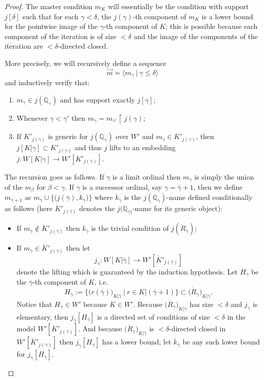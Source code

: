 \documentclass{amsart}
\begin{document}
\begin{proof}
The master condition $m_K$ will essentially be the condition with support $j[\delta]$ such that for each $\gamma < \delta$, the $j(\gamma)$-th component of $m_K$ is a lower bound for the pointwise image of the $\gamma$-th component of $K$; this is possible because each component of the iteration is of size $<\delta$ and the image of the components of the iteration are $<\delta$-directed closed.

More precisely, we will recursively define a sequence
\[
\vec{m} = \langle m_\gamma \ | \ \gamma \le \delta \rangle
\]
 and inductively verify that:
\begin{enumerate}
 \item $m_\gamma \in j(\mathbb{Q}_\gamma)$ and has support exactly $j[\gamma]$;
 \item Whenever $\gamma < \gamma'$ then $m_\gamma = m_{\gamma'} \restriction j(\gamma)$;
 \item If $K'_{j(\gamma)}$ is generic for $j(\mathbb{Q}_\gamma)$ over $W'$ and $m_\gamma \in K'_{j(\gamma)}$, then $j[K|\gamma] \subset K'_{j(\gamma)}$ and thus $j$ lifts to an embedding $j: W[K|\gamma] \to W'[K'_{j(\gamma)}]$.
\end{enumerate}

The recursion goes as follows.  If $\gamma$ is a limit ordinal then $m_\gamma$ is simply the union of the $m_\beta$ for $\beta < \gamma$.  If $\gamma$ is a successor ordinal, say $\gamma = \bar{\gamma}+1$, then we define $m_{\bar{\gamma}+1}$ as $m_{\bar{\gamma}} \cup \{ \big(j(\bar{\gamma}), \dot{k}_{\bar{\gamma}} \big) \}$ where $\dot{k}_{\bar{\gamma}}$ is the $j(\mathbb{Q}_{\bar{\gamma}})$-name defined conditionally as follows (here $\dot{K}'_{j(\bar{\gamma})}$ denotes the $j(\mathbb{Q}_{\bar{\gamma})}$-name for its generic object):
\begin{itemize}
 \item If $m_{\bar{\gamma}} \notin \dot{K}'_{j(\bar{\gamma})}$ then $\dot{k}_{\bar{\gamma}}$ is the trivial condition of $j(\dot{R}_{\bar{\gamma}})$;
 \item If $m_{\bar{\gamma}} \in \dot{K}'_{j(\bar{\gamma})}$ then let 
\[ 
 j_{\bar{\gamma}}: W[K|\bar{\gamma}] \to  W'[\dot{K}'_{j(\bar{\gamma})}]
\]
denote the lifting which is guaranteed by the induction hypothesis.  Let $H_{\bar{\gamma}}$ be the $\bar{\gamma}$-th component of $K$, i.e.\ 
 \[
 H_{\bar{\gamma}}:= \{ \big(r(\bar{\gamma})\big)_{K|\bar{\gamma}} \ | \  r \in K|(\bar{\gamma}+1)   \} \subset \big( \dot{R}_{\bar{\gamma}} \big)_{K|\bar{\gamma}}.
 \]
Notice that $H_{\bar{\gamma}} \in W'$ because $K \in W'$.  Because $\big( \dot{R}_{\bar{\gamma}} \big)_{K|\bar{\gamma}}$ has size $<\delta$ and $j_{\bar{\gamma}}$ is elementary, then $j_{\bar{\gamma}}[H_{\bar{\gamma}}]$ is a directed set of conditions of size $<\delta$ in the model $W'[\dot{K}'_{j(\bar{\gamma})}]$.  And because $\big( \dot{R}_{\bar{\gamma}} \big)_{K|\bar{\gamma}}$ is $<\delta$-directed closed in $W'[\dot{K}'_{j(\bar{\gamma})}]$ then $j_{\bar{\gamma}}[H_{\bar{\gamma}}]$ has a lower bound; let $\dot{k}_{\bar{\gamma}}$ be any such lower bound for $j_{\bar{\gamma}}[H_{\bar{\gamma}}]$.
\end{itemize}


\end{proof}
\end{document}
